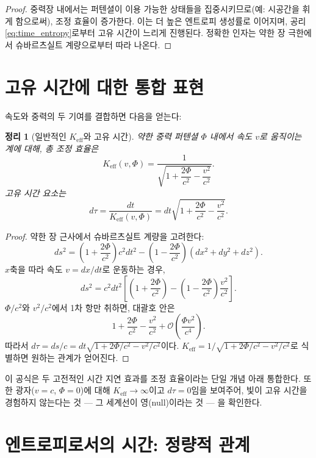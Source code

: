 \documentclass[12pt,a4paper]{article}
\newtheorem{theorem}{정리}[section]
\newcommand{\Keff}{K_{\mathrm{eff}}}
\begin{document}
	\begin{proof}
		중력장 내에서는 퍼텐셜이 이용 가능한 상태들을 집중시키므로(예: 시공간을 휘게 함으로써), 조정 효율이 증가한다. 이는 더 높은 엔트로피 생성률로 이어지며, 공리 \ref{eq:time_entropy}로부터 고유 시간이 느리게 진행된다. 정확한 인자는 약한 장 극한에서 슈바르츠실트 계량으로부터 따라 나온다.
	\end{proof}
	
	\section{고유 시간에 대한 통합 표현}
	\label{sec:unified}
	
	속도와 중력의 두 기여를 결합하면 다음을 얻는다:
	
	\begin{theorem}[일반적인 \(\Keff\)와 고유 시간]
		약한 중력 퍼텐셜 \(\Phi\) 내에서 속도 \(v\)로 움직이는 계에 대해, 총 조정 효율은
		\begin{equation}
			\Keff(v,\Phi) = \frac{1}{\sqrt{1 + \dfrac{2\Phi}{c^2} - \dfrac{v^2}{c^2}}}.
		\end{equation}
		고유 시간 요소는
		\begin{equation}
			d\tau = \frac{dt}{\Keff(v,\Phi)} = dt\sqrt{1 + \frac{2\Phi}{c^2} - \frac{v^2}{c^2}}.
		\end{equation}
	\end{theorem}
	
	\begin{proof}
		약한 장 근사에서 슈바르츠실트 계량을 고려한다:
		\[
		ds^2 = \left(1+\frac{2\Phi}{c^2}\right)c^2 dt^2 - \left(1-\frac{2\Phi}{c^2}\right)(dx^2+dy^2+dz^2).
		\]
		\(x\)축을 따라 속도 \(v = dx/dt\)로 운동하는 경우,
		\[
		ds^2 = c^2 dt^2\left[ \left(1+\frac{2\Phi}{c^2}\right) - \left(1-\frac{2\Phi}{c^2}\right)\frac{v^2}{c^2} \right].
		\]
		\(\Phi/c^2\)와 \(v^2/c^2\)에서 1차 항만 취하면, 대괄호 안은
		\[
		1 + \frac{2\Phi}{c^2} - \frac{v^2}{c^2} + \mathcal{O}\left(\frac{\Phi v^2}{c^4}\right).
		\]
		따라서 \(d\tau = ds/c = dt\sqrt{1 + 2\Phi/c^2 - v^2/c^2}\)이다. \(\Keff = 1/\sqrt{1 + 2\Phi/c^2 - v^2/c^2}\)로 식별하면 원하는 관계가 얻어진다.
	\end{proof}
	
	이 공식은 두 고전적인 시간 지연 효과를 조정 효율이라는 단일 개념 아래 통합한다. 또한 광자(\(v=c\), \(\Phi=0\))에 대해 \(\Keff \to \infty\)이고 \(d\tau = 0\)임을 보여주어, 빛이 고유 시간을 경험하지 않는다는 것 — 그 세계선이 영(null)이라는 것 — 을 확인한다.
	
	\section{엔트로피로서의 시간: 정량적 관계}
	\label{sec:entropy}
	
\end{document}
